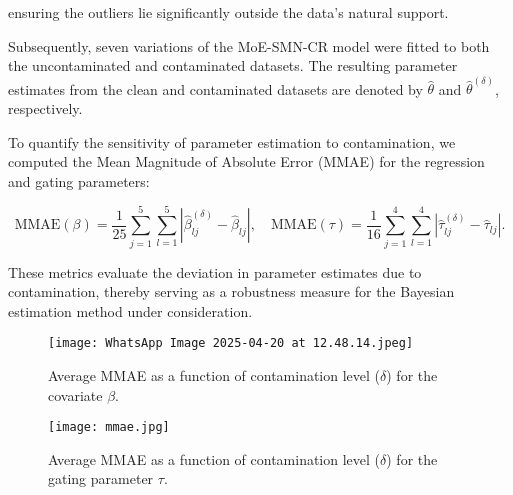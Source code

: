 \documentclass[10.5pt]{article} %
\begin{document}
\vspace{1em}

ensuring the outliers lie significantly outside the data’s natural support.

\vspace{1em}
\noindent
Subsequently, seven variations of the MoE-SMN-CR model were fitted to both the uncontaminated and contaminated datasets. The resulting parameter estimates from the clean and contaminated datasets are denoted by $\hat{\theta}$ and $\hat{\theta}^{(\delta)}$, respectively.

\vspace{1em}
\noindent
To quantify the sensitivity of parameter estimation to contamination, we computed the Mean Magnitude of Absolute Error (MMAE) for the regression and gating parameters:

\vspace{1em}

\[
\text{MMAE}(\beta) = \frac{1}{25} \sum_{j=1}^{5} \sum_{l=1}^{5} \left| \hat{\beta}_{lj}^{(\delta)} - \hat{\beta}_{lj} \right|, \quad
\text{MMAE}(\tau) = \frac{1}{16} \sum_{j=1}^{4} \sum_{l=1}^{4} \left| \hat{\tau}_{lj}^{(\delta)} - \hat{\tau}_{lj} \right|.
\]

\vspace{1em}

\noindent
These metrics evaluate the deviation in parameter estimates due to contamination, thereby serving as a robustness measure for the Bayesian estimation method under consideration.

\begin{figure}[H]
    \centering
    \texttt{[image: WhatsApp Image 2025-04-20 at 12.48.14.jpeg]}
    \caption{Average MMAE as a function of contamination level ($\delta$) for the covariate $\beta$.}
\end{figure}
\begin{figure}[H]
    \centering
    \texttt{[image: mmae.jpg]}
    \caption{Average MMAE as a function of contamination level ($\delta$) for the gating parameter $\tau$.}
\end{figure}
\end{document}
